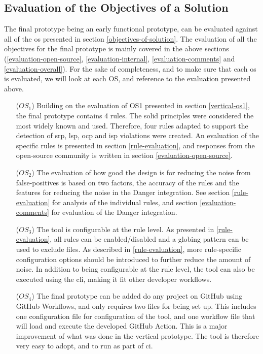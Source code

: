 \documentclass{report}
\begin{document}
\subsection{Evaluation of the Objectives of a Solution}

The final prototype being an early functional prototype, can be evaluated against all of the \gls{os} presented in section \ref{objectives-of-solution}. The evaluation of all the objectives for the final prototype is mainly covered in the above sections (\ref{evaluation-open-source}, \ref{evaluation-internal}, \ref{evaluation-comments} and \ref{evaluation-overall}). For the sake of completeness, and to make sure that each \gls{os} is evaluated, we will look at each OS, and reference to the evaluation presented above. 



\begin{itemize}
    \item [(\(OS_{1}\))] Building on the evaluation of OS1 presented in section \ref{vertical-os1}, the final prototype contains 4 rules. The \gls{solid} principles were considered the most widely known and used. Therefore, four rules adapted to support the detection of \gls{srp}, \gls{lsp}, \gls{ocp} and \gls{isp} violations were created. An evaluation of the specific rules is presented in section \ref{rule-evaluation}, and responses from the open-source community is written in section \ref{evaluation-open-source}.
    
    \item [(\(OS_{2}\))] The evaluation of how good the design is for reducing the noise from false-positives is based on two factors, the accuracy of the rules and the features for reducing the noise in the Danger integration. See section \ref{rule-evaluation} for analysis of the individual rules, and section \ref{evaluation-comments} for evaluation of the Danger integration. 
    
    \item [(\(OS_{3}\))] The tool is configurable at the rule level. As presented in \ref{rule-evaluation}, all rules can be enabled/disabled and a globing pattern can be used to exclude files. As described in \ref{rule-evaluation}, more rule-specific configuration options should be introduced to further reduce the amount of noise. In addition to being configurable at the rule level, the tool can also be executed using the \gls{cli}, making it fit other developer workflows. 
    
    \item [(\(OS_{4}\))] The final prototype can be added do any project on GitHub using GitHub Workflows, and only requires two files for being set up. This includes one configuration file for configuration of the tool, and one workflow file that will load and execute the developed GitHub Action. This is a major improvement of what was done in the vertical prototype. The tool is therefore very easy to adopt, and to run as part of \gls{ci}.

\end{itemize}
\end{document}
